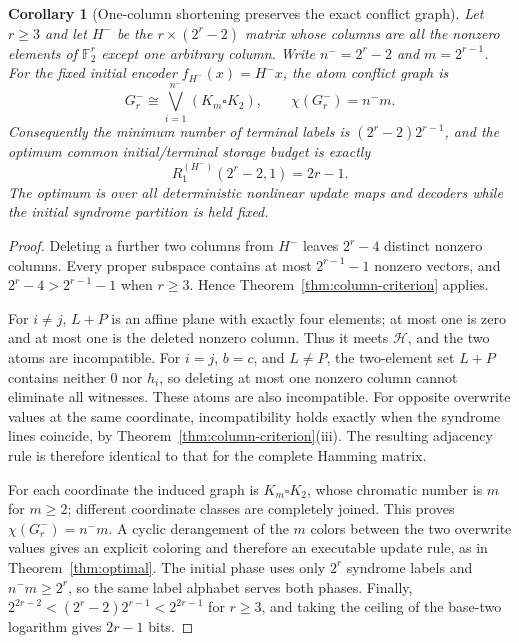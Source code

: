\documentclass[11pt,a4paper]{article}
\newtheorem{corollary}[theorem]{Corollary}
\begin{document}
\begin{corollary}[One-column shortening preserves the exact conflict graph]\label{cor:shortened}
Let $r\ge3$ and let $H^-$ be the $r\times(2^r-2)$ matrix whose columns are all the nonzero elements of $\mathbb F_2^r$ except one arbitrary column. Write $n^-=2^r-2$ and $m=2^{r-1}$. For the fixed initial encoder $f_{H^-}(x)=H^-x$, the atom conflict graph is
\[
\boxed{\quad G^-_r\cong\bigvee_{i=1}^{n^-}(K_m\square K_2),\qquad
\chi(G^-_r)=n^-m.\quad}
\]
Consequently the minimum number of terminal labels is $(2^r-2)2^{r-1}$, and the optimum common initial/terminal storage budget is exactly
\[
\boxed{\quad R_1^{(H^-)}(2^r-2,1)=2r-1.\quad}
\]
The optimum is over all deterministic nonlinear update maps and decoders while the initial syndrome partition is held fixed.
\end{corollary}
\begin{proof}
Deleting a further two columns from $H^-$ leaves $2^r-4$ distinct nonzero columns. Every proper subspace contains at most $2^{r-1}-1$ nonzero vectors, and $2^r-4>2^{r-1}-1$ when $r\ge3$. Hence Theorem~\ref{thm:column-criterion} applies.

For $i\ne j$, $L+P$ is an affine plane with exactly four elements; at most one is zero and at most one is the deleted nonzero column. Thus it meets $\mathscr H$, and the two atoms are incompatible. For $i=j$, $b=c$, and $L\ne P$, the two-element set $L+P$ contains neither $0$ nor $h_i$, so deleting at most one nonzero column cannot eliminate all witnesses. These atoms are also incompatible. For opposite overwrite values at the same coordinate, incompatibility holds exactly when the syndrome lines coincide, by Theorem~\ref{thm:column-criterion}(iii). The resulting adjacency rule is therefore identical to that for the complete Hamming matrix.

For each coordinate the induced graph is $K_m\square K_2$, whose chromatic number is $m$ for $m\ge2$; different coordinate classes are completely joined. This proves $\chi(G^-_r)=n^-m$. A cyclic derangement of the $m$ colors between the two overwrite values gives an explicit coloring and therefore an executable update rule, as in Theorem~\ref{thm:optimal}. The initial phase uses only $2^r$ syndrome labels and $n^-m\ge 2^r$, so the same label alphabet serves both phases. Finally,
$2^{2r-2}< (2^r-2)2^{r-1}<2^{2r-1}$ for $r\ge3$, and taking the ceiling of the base-two logarithm gives $2r-1$ bits.
\end{proof}
\end{document}
